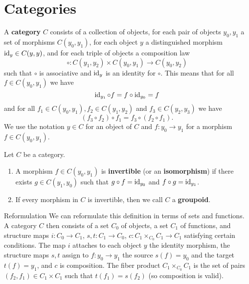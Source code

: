 \section{Categories} 
\begin{definition}[]
    A \textbf{category} $C$ consists of a collection of objects, for each pair of objects $y_0,y_1$ a set of morphisms $C(y_0,y_1)$, for each object $y$ a distinguished morphism $\operatorname{id}_y \in C(y,y)$, and for each triple of objects a composition law \[
        \circ \colon C(y_1,y_2) \times C(y_0,y_1) \to C(y_0,y_2)
    \] such that $\circ $ is associative and $\operatorname{id}_y$ is an identity for $\circ $. This means that for all $f \in C(y_0,y_1)$ we have \[
    \operatorname{id} _{y_1}\circ f=f \circ \operatorname{id} _{y_0}=f
\] and for all $f_1 \in C(y_0,y_1), f_2 \in C(y_1,y_2)$ and $f_3 \in C(y_2,y_3)$ we have \[
(f_3 \circ f_2) \circ f_1=f_3 \circ (f_2 \circ f_1).
\] We use the notation $y \in C$ for an object of $C$ and $f \colon y_0 \to y_1$ for a morphism $f \in C(y_0,y_1)$.
\end{definition}
\begin{definition}[]
    Let $C$ be a category.
    \begin{enumerate}[label=(\roman*)]
    \setlength\itemsep{-.2em}
\item A morphism $f \in C(y_0,y_1)$ is \textbf{invertible} (or an \textbf{isomorphism}) if there exists $g \in C(y_1,y_0)$ such that $g \circ f=\operatorname{id} _{y_0}$ and $f \circ g=\operatorname{id} _{y_1}$.
\item If every morphism in $C$ is invertible, then we call $C$ a \textbf{groupoid}.
    \end{enumerate}
\end{definition}
\begin{namedthing}{Reformulation} 
    We can reformulate this definition in terms of sets and functions. A category $C$ then consists of a set $C_0$ of objects, a set $C_1$ of functions, and structure maps $i \colon C_0 \to C_1$, $s,t \colon C_1 \to C_0$, $c \colon C_1 \times _{C_0} C_1\to C_1$ satisfying certain conditions. The map $i$ attaches to each object $y$ the identity morphism, the structure maps $s,t$ assign to  $f \colon y_0 \to y_1$ the source $s(f)=y_0$ and the target $t(f)=y_1$, and $c$ is composition. The fiber product $C_1 \times _{C_0}C_1$ is the set of pairs $(f_2,f_1) \in C_1 \times C_1$ such that $t(f_1)=s(f_2)$ (so composition is valid).
\end{namedthing}

